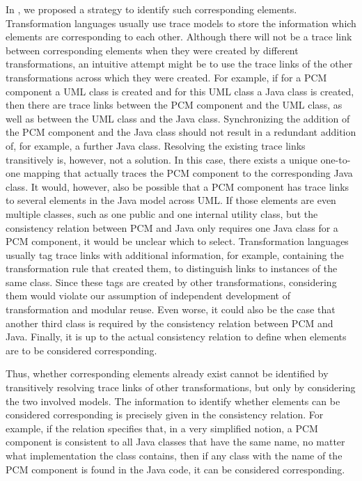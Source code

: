 In , we proposed a strategy to identify such corresponding elements.
Transformation languages usually use trace models to store the information which elements are corresponding to each other.
Although there will not be a trace link between corresponding elements when they were created by different transformations, an intuitive attempt might be to use the trace links of the other transformations across which they were created.
For example, if for a \gls{PCM} component a UML class is created and for this UML class a Java class is created, then there are trace links between the \gls{PCM} component and the UML class, as well as between the UML class and the Java class.
Synchronizing the addition of the \gls{PCM} component and the Java class should not result in a redundant addition of, for example, a further Java class.
Resolving the existing trace links transitively is, however, not a solution.
In this case, there exists a unique one-to-one mapping that actually traces the \gls{PCM} component to the corresponding Java class.
It would, however, also be possible that a \gls{PCM} component has trace links to several elements in the Java model across UML.
If those elements are even multiple classes, such as one public and one internal utility class, but the consistency relation between \gls{PCM} and Java only requires one Java class for a \gls{PCM} component, it would be unclear which to select.
Transformation languages usually tag trace links with additional information, for example, containing the transformation rule that created them, to distinguish links to instances of the same class.
Since these tags are created by other transformations, considering them would violate our assumption of independent development of transformation and modular reuse.
Even worse, it could also be the case that another third class is required by the consistency relation between \gls{PCM} and Java.
Finally, it is up to the actual consistency relation to define when elements are to be considered corresponding.

Thus, whether corresponding elements already exist cannot be identified by transitively resolving trace links of other transformations, but only by considering the two involved models.
The information to identify whether elements can be considered corresponding is precisely given in the consistency relation.
For example, if the relation specifies that, in a very simplified notion, a \gls{PCM} component is consistent to all Java classes that have the same name, no matter what implementation the class contains, then if any class with the name of the \gls{PCM} component is found in the Java code, it can be considered corresponding.

